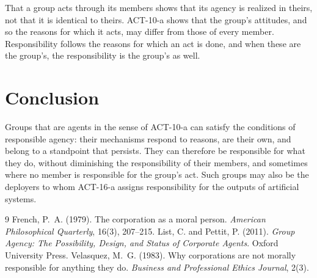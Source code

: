 \documentclass{situationist-preprint}
\begin{document}
\begin{reply}
That a group acts through its members shows that its agency is realized in theirs, not that it is identical to theirs. ACT-10-a shows that the group's attitudes, and so the reasons for which it acts, may differ from those of every member. Responsibility follows the reasons for which an act is done, and when these are the group's, the responsibility is the group's as well.
\end{reply}

\section{Conclusion}

Groups that are agents in the sense of ACT-10-a can satisfy the conditions of responsible agency: their mechanisms respond to reasons, are their own, and belong to a standpoint that persists. They can therefore be responsible for what they do, without diminishing the responsibility of their members, and sometimes where no member is responsible for the group's act. Such groups may also be the deployers to whom ACT-16-a assigns responsibility for the outputs of artificial systems.

\begin{thebibliography}{9}\small
{} French, P.~A. (1979). The corporation as a moral person. \emph{American Philosophical Quarterly}, 16(3), 207--215.
 List, C. and Pettit, P. (2011). \emph{Group Agency: The Possibility, Design, and Status of Corporate Agents}. Oxford University Press.
 Velasquez, M.~G. (1983). Why corporations are not morally responsible for anything they do. \emph{Business and Professional Ethics Journal}, 2(3).
\end{thebibliography}
\end{document}
